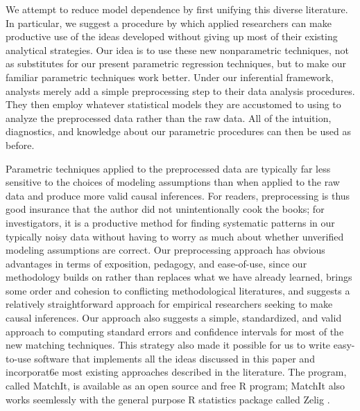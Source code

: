 \documentclass[11pt,titlepage]{article}
\begin{document}
We attempt to reduce model dependence by first unifying this diverse
literature.  In particular, we suggest a procedure by which applied
researchers can make productive use of the ideas developed without
giving up most of their existing analytical strategies.  Our idea is
to use these new nonparametric techniques, not as substitutes for our
present parametric regression techniques, but to make our familiar
parametric techniques work better.  Under our inferential framework,
analysts merely add a simple preprocessing step to their data analysis
procedures.  They then employ whatever statistical models they are
accustomed to using to analyze the preprocessed data rather than the
raw data.  All of the intuition, diagnostics, and knowledge about our
parametric procedures can then be used as before.

Parametric techniques applied to the preprocessed data are typically
far less sensitive to the choices of modeling assumptions than when
applied to the raw data and produce more valid causal inferences.  For
readers, preprocessing is thus good insurance that the author did not
unintentionally cook the books; for investigators, it is a productive
method for finding systematic patterns in our typically noisy data
without having to worry as much about whether unverified modeling
assumptions are correct.  Our preprocessing approach has obvious
advantages in terms of exposition, pedagogy, and ease-of-use, since
our methodology builds on rather than replaces what we have already
learned, brings some order and cohesion to conflicting methodological
literatures, and suggests a relatively straightforward approach for
empirical researchers seeking to make causal inferences. Our approach
also suggests a simple, standardized, and valid approach to computing
standard errors and confidence intervals for most of the new matching
techniques.  This strategy also made it possible for us to write
easy-to-use software that implements all the ideas discussed in this
paper and incorporat6e most existing approaches described in the
literature.  The program, called MatchIt, is available as an open
source and free R program; MatchIt also works seemlessly with the
general purpose R statistics package called Zelig \citep{ImaKinLau04}.
\end{document}
